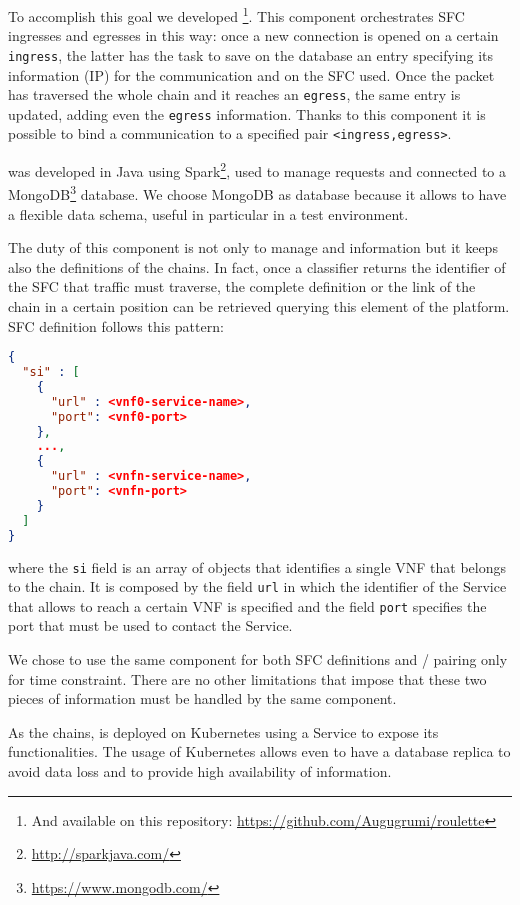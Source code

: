 \noindent
To accomplish this goal we developed \roulette{}\footnote{And available on
this repository: \url{https://github.com/Augugrumi/roulette}}. This component
orchestrates SFC ingresses and egresses in this way: once a new connection is
opened on a certain \texttt{ingress}, the latter has the task to save on the
\roulette{} database an entry specifying its information (IP) for the
communication and on the SFC used. Once the packet has traversed the whole chain
and it reaches an \texttt{egress}, the same entry is updated, adding even the 
\texttt{egress} information. Thanks to this component it is possible to bind a
communication to a specified pair \verb!<ingress,egress>!.

\roulette{} was developed in Java using
Spark\footnote{\url{http://sparkjava.com/}}, used to manage requests and
connected to a MongoDB\footnote{\url{https://www.mongodb.com/}} database. We
choose MongoDB as database because it allows to have a flexible data schema,
useful in particular in a test environment.

The duty of this component is not only to manage \ingresses{} and \egresses{}
information but it keeps also the definitions of the chains. In fact, once a
classifier returns the identifier of the SFC that traffic must traverse, the
complete definition or the link of the chain in a certain position can be
retrieved querying this element of the platform. SFC definition follows this
pattern:

\begin{lstlisting}[caption={Definition of an SFC on \roulette{}.}, captionpos=b,
                   language=json]
{
  "si" : [
    {
      "url" : <vnf0-service-name>,
      "port": <vnf0-port>
    },
    ...,
    {
      "url" : <vnfn-service-name>,
      "port": <vnfn-port>
    }
  ]
}
\end{lstlisting}

\noindent
where the \texttt{si} field is an array of objects that identifies a single VNF
that belongs to the chain. It is composed by the field \texttt{url} in which the
identifier of the Service that allows to reach a certain VNF is specified and
the field \texttt{port} specifies the port that must be used to contact the
Service.

We chose to use the same component for both SFC definitions and 
\ingress{}/\egresses{} pairing only for time constraint. There are no other
limitations that impose that these two pieces of information must be handled by
the same component. 

As the chains, \roulette{} is deployed on Kubernetes using a Service to expose
its functionalities. The usage of Kubernetes allows even to have a database
replica to avoid data loss and to provide high availability of information.

